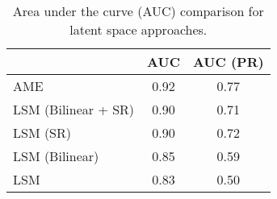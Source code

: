 \begin{table}[ht]
\centering
\begingroup\normalsize
\begin{tabular}{lcc}
  & AUC & AUC (PR) \\ 
  \hline
\hline
AME & 0.92 & 0.77 \\ 
  LSM (Bilinear + SR) & 0.90 & 0.71 \\ 
  LSM (SR) & 0.90 & 0.72 \\ 
  LSM (Bilinear) & 0.85 & 0.59 \\ 
  LSM & 0.83 & 0.50 \\ 
  \end{tabular}
\endgroup
\caption{Area under the curve (AUC) comparison for latent space approaches.} 
\label{tab:aucTable_latSpace}
\end{table}
